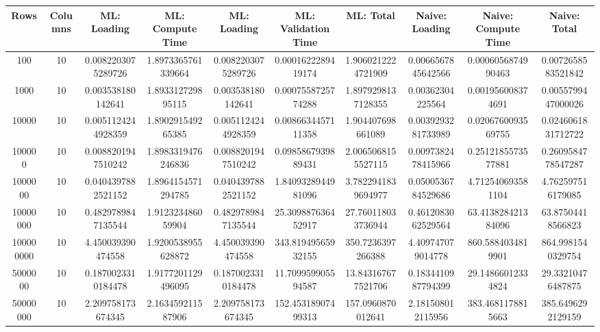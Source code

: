 \begin{table}[htb]
    \centering
    \begin{tabular}{@{}cccccccccc@{}}
        \toprule
        Rows & Columns & ML: Loading & ML: Compute Time & ML: Loading & ML: Validation Time & ML: Total & Naive: Loading & Naive: Compute Time & Naive: Total \\
        \midrule
        100 & 10 & 0.0082203075289726 & 1.8973365761339664 & 0.0082203075289726 & 0.0001622289419174 & 1.9060212224721909 & 0.0066567845642566 & 0.0006056874990463 & 0.0072658583521842 \\
        1000 & 10 & 0.003538180142641 & 1.893312729895115 & 0.003538180142641 & 0.0007558725774288 & 1.8979298137128355 & 0.00362304225564 & 0.001956008374691 & 0.0055799447000026 \\
        10000 & 10 & 0.0051124244928359 & 1.890291549265385 & 0.0051124244928359 & 0.0086634457111358 & 1.904407698661089 & 0.0039293281733989 & 0.0206760093569755 & 0.0246061831712722 \\
        100000 & 10 & 0.0088201947510242 & 1.8983319476246836 & 0.0088201947510242 & 0.0985867939889431 & 2.0065068155527115 & 0.0097382478415966 & 0.2512185573577881 & 0.2609584778547287 \\
        1000000 & 10 & 0.0404397882521152 & 1.8964154571294785 & 0.0404397882521152 & 1.8409328944981096 & 3.7822941839694977 & 0.0500536784529686 & 4.712540693581104 & 4.762597516179085 \\
        10000000 & 10 & 0.4829789847135544 & 1.912323486059904 & 0.4829789847135544 & 25.309887636452917 & 27.760118033736944 & 0.4612083062529564 & 63.413828421384096 & 63.87504418566823 \\
        100000000 & 10 & 4.450039390474558 & 1.9200538955628872 & 4.450039390474558 & 343.81949565932155 & 350.7236397266388 & 4.409747079014778 & 860.5884034819901 & 864.9981540329754 \\
        5000000 & 10 & 0.1870023310184478 & 1.9177201129496095 & 0.1870023310184478 & 11.709959905594587 & 13.843167677521706 & 0.1834410987794399 & 29.14866012334824 & 29.33210476487875 \\
        50000000 & 10 & 2.209758173674345 & 2.163459211587906 & 2.209758173674345 & 152.45318907499313 & 157.0960870012641 & 2.181508012115956 & 383.4681178815663 & 385.6496292129159 \\
        \bottomrule
    \end{tabular}
\end{table}